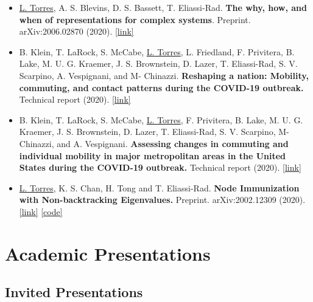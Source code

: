 \documentclass[12pt,]{scrartcl}
\newenvironment{myitemize}
{ \begin{itemize}
    \setlength{\itemsep}{5pt}
    \setlength{\parskip}{0pt}
    \setlength{\parsep}{0pt}     }
{ \end{itemize}                  }
\begin{document}
\begin{myitemize}
\leftskip-0.25in %

\item \underline{L. Torres}, A. S. Blevins, D. S. Bassett, T. Eliassi-Rad. \textbf{The why, how, and when of representations for complex systems}. Preprint. arXiv:2006.02870 (2020). \href{https://arxiv.org/abs/2006.02870}{[link]}

\item B. Klein, T. LaRock, S. McCabe, \underline{L. Torres}, L. Friedland, F. Privitera, B. Lake, M. U. G. Kraemer, J. S. Brownstein, D. Lazer, T. Eliassi-Rad, S. V. Scarpino, A. Vespignani, and M- Chinazzi. \textbf{Reshaping a nation: Mobility, commuting, and contact patterns during the COVID-19 outbreak.} Technical report (2020). \href{https://www.mobs-lab.org/uploads/6/7/8/7/6787877/covid19mobility_report2.pdf}{[link]}

\item B. Klein, T. LaRock, S. McCabe, \underline{L. Torres}, F. Privitera, B. Lake, M. U. G. Kraemer, J. S. Brownstein, D. Lazer, T. Eliassi-Rad, S. V. Scarpino, M- Chinazzi, and A. Vespignani. \textbf{Assessing changes in commuting and individual mobility in major metropolitan areas in the United States during the COVID-19 outbreak.} Technical report (2020). \href{https://www.mobs-lab.org/uploads/6/7/8/7/6787877/assessing_mobility_changes_in_the_united_states_during_the_covid_19_outbreak.pdf}{[link]}

\item \underline{L. Torres}, K. S. Chan, H. Tong and T. Eliassi-Rad. \textbf{Node Immunization with Non-backtracking Eigenvalues.} Preprint. arXiv:2002.12309 (2020). \href{https://arxiv.org/abs/2002.12309}{[link]} \href{https://github.com/leotrs/inbox}{[code]}

\end{myitemize}


\section{Academic Presentations}\label{presentations}

\subsection{Invited Presentations}\label{invited-presentations}
\end{document}
